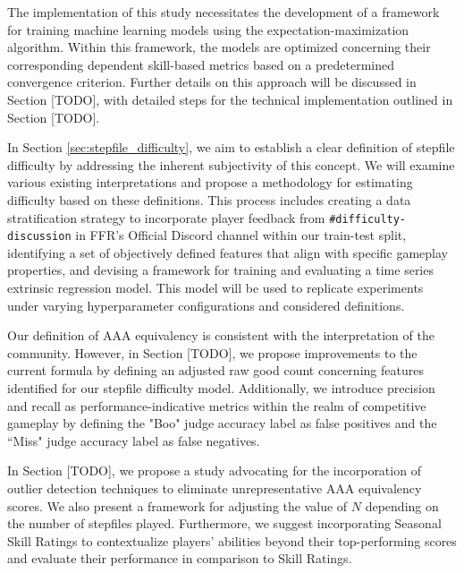 The implementation of this study necessitates the development of a framework for training machine learning models using the expectation-maximization algorithm. Within this framework, the models are optimized concerning their corresponding dependent skill-based metrics based on a predetermined convergence criterion. Further details on this approach will be discussed in Section [TODO], with detailed steps for the technical implementation outlined in Section [TODO].

\vspace{2mm}

In Section \ref{sec:stepfile_difficulty}, we aim to establish a clear definition of stepfile difficulty by addressing the inherent subjectivity of this concept. We will examine various existing interpretations and propose a methodology for estimating difficulty based on these definitions. This process includes creating a data stratification strategy to incorporate player feedback from \texttt{\#difficulty-discussion} in FFR's Official Discord channel within our train-test split, identifying a set of objectively defined features that align with specific gameplay properties, and devising a framework for training and evaluating a time series extrinsic regression model. This model will be used to replicate experiments under varying hyperparameter configurations and considered definitions.

\vspace{2mm}

Our definition of AAA equivalency is consistent with the interpretation of the community. However, in Section [TODO], we propose improvements to the current formula by defining an adjusted raw good count concerning features identified for our stepfile difficulty model. Additionally, we introduce precision and recall as performance-indicative metrics within the realm of competitive gameplay by defining the "Boo" judge accuracy label as false positives and the ``Miss" judge accuracy label as false negatives.

\vspace{2mm}

In Section [TODO], we propose a study advocating for the incorporation of outlier detection techniques to eliminate unrepresentative AAA equivalency scores. We also present a framework for adjusting the value of $N$ depending on the number of stepfiles played. Furthermore, we suggest incorporating Seasonal Skill Ratings to contextualize players' abilities beyond their top-performing scores and evaluate their performance in comparison to Skill Ratings.
